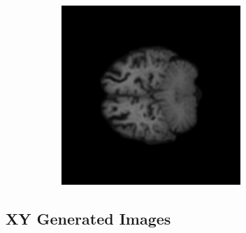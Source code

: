 \documentclass[12pt, fleqn, titlepage]{article}
\newcommand\skipper{1.4pt}
\begin{document}
\begin{figure}[H]
\begin{subfigure}[b]{0.7\textwidth}
		\hskip\skipper
		\includegraphics[width=0.22\linewidth]{imgs/training_progress/XY_model_3T_epoch_1_idx_77000}
	\end{subfigure}
\end{figure}

\subsection{XY Generated Images}\label{xy_generated}
\end{document}
